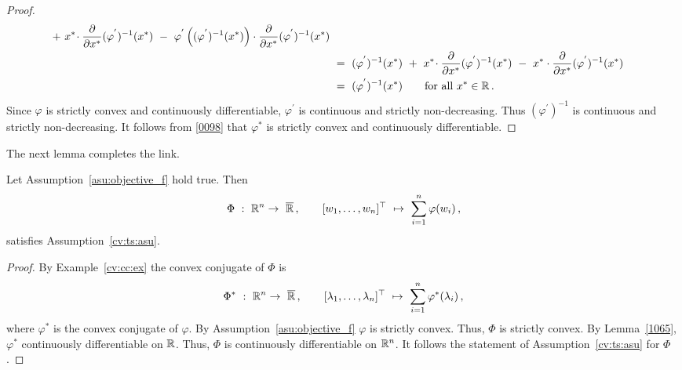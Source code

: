 \begin{proof}
\begin{align}
\begin{split}
    +
    \ 
    x^*
    \!
    \cdot
    \frac{\partial}{\partial x^*}
    (
    \varphi^{'}
    )^{-1}
    (x^*)
    \ 
    -
    \ 
    \varphi^{'}
    \left( 
      (
    \varphi^{'}
    )^{-1}
    (x^*)
    \right)
    \cdot
    \frac{\partial}{\partial x^*}
    (
    \varphi^{'}
    )^{-1}
    (x^*)
    \\
    &
    \ 
    =
    \ 
    (
    \varphi^{'}
    )^{-1}
    (x^*)
    \ 
    +
    \ 
    x^*
    \!
    \cdot
    \frac{\partial}{\partial x^*}
    (
    \varphi^{'}
    )^{-1}
    (x^*)
    \ 
    -
    \ 
    x^*
    \cdot
    \frac{\partial}{\partial x^*}
    (
    \varphi^{'}
    )^{-1}
    (x^*)
    \\
    &
    \ 
    =
    \ 
    (
    \varphi^{'}
    )^{-1}
    (x^*)
    \qquad
    \text{for all}\ 
    x^*\in\R
    \,.
    \end{split}
  \end{align}
  Since $\varphi$ is strictly convex and continuously differentiable, 
  $\varphi^{'}$ is continuous and strictly non-decreasing.
  Thus 
  $
    (
    \varphi^{'}
    )^{-1}
  $
  is continuous and strictly non-decreasing.
  It follows from \eqref{0098} that $\varphi^*$ is strictly convex and continuously differentiable.
\end{proof}
The next lemma completes the link.
\begin{lemma}
  Let Assumption~\ref{asu:objective_f} hold true. Then 
\begin{gather*}
  \Phi
  \ 
  :
  \ 
  \R^n
  \to
  \ 
  \overline{\R}
  \,
  ,
  \qquad
  [w_1,\ldots,w_n]^\top
  \ 
  \mapsto
  \ 
  \sum_{i=1}^n \varphi(w_i)
  \,,
\end{gather*}
satisfies Assumption~\ref{cv:ts:asu}.
\end{lemma}
\begin{proof}
  By Example~\ref{cv:cc:ex}
  the convex conjugate of $\Phi$ is 
\begin{gather*}
  \Phi^*
  \ 
  :
  \ 
  \R^n
  \to
  \ 
  \overline{\R}
  \,
  ,
  \qquad
  [\lambda_1,\ldots,\lambda_n]^\top
  \ 
  \mapsto
  \ 
  \sum_{i=1}^n \varphi^*(\lambda_i)
  \,,
\end{gather*}
where $\varphi^*$ is the convex conjugate of $\varphi$.
By Assumption~\ref{asu:objective_f} $\varphi$ is strictly convex. Thus,
$\Phi$ is strictly convex. By Lemma~\ref{1065}, $\varphi^*$ continuously differentiable on $\mathbb{R}$. Thus,
$\Phi$ is continuously differentiable on $\mathbb{R}^n$.
It follows the statement of Assumption~\ref{cv:ts:asu} for $\Phi$.
\end{proof}
